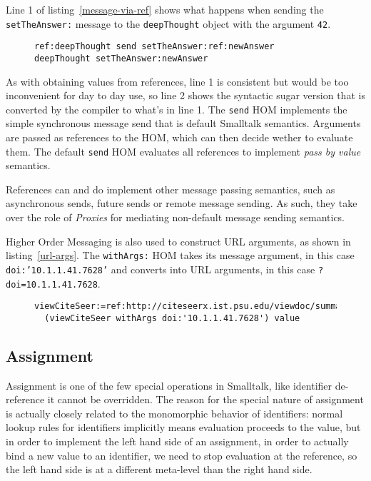 \documentclass[preprint,authoryear]{llncs}
\begin{document}
  Line 1 of listing~\ref{message-via-ref} shows
what happens when sending the {\tt setTheAnswer:} message to the {\tt deepThought} object with
the argument {\tt 42}.

\begin{figure}[htbp]
\begin{lstlisting}[style=numbers,label=message-via-ref,caption=Message sending via reference and with syntactic sugar]
ref:deepThought send setTheAnswer:ref:newAnswer
deepThought setTheAnswer:newAnswer
\end{lstlisting}
\end{figure}

As with obtaining values from references, line 1 is consistent but would be too inconvenient for day to day use,
so line 2 shows the syntactic sugar version that is converted by the compiler to what's in line 1.  The {\tt send}
HOM implements the simple synchronous message send that is default Smalltalk semantics.   Arguments
are passed as references to the HOM, which can then decide wether to evaluate them.  The default {\tt send}
HOM evaluates all references to implement \emph{pass by value} semantics.

References can and do implement other message passing semantics, such as asynchronous sends, future
sends or remote message sending.  As such, they take over the role of \emph{Proxies} for mediating non-default
message sending semantics.  


Higher Order Messaging is also used to construct URL arguments, as shown in listing~\ref{url-args}.  The {\tt withArgs:}
HOM takes its message argument, in this case {\tt doi:'10.1.1.41.7628'} and converts into URL arguments,
in this case {\tt ?doi=10.1.1.41.7628}.

\begin{figure}[htbp]
\begin{lstlisting}[style=L,label=url-args,caption=URL arguments via reference and higher order message.]
  viewCiteSeer:=ref:http://citeseerx.ist.psu.edu/viewdoc/summary.
  (viewCiteSeer withArgs doi:'10.1.1.41.7628') value
\end{lstlisting}
\end{figure}


\subsection{Assignment}

Assignment is one of the few special operations in Smalltalk, like identifier de-reference it cannot be overridden.
The reason for the special nature of assignment is actually closely related to the monomorphic behavior
of identifiers:  normal lookup rules for identifiers implicitly means evaluation proceeds to the value, but in order to implement the left
hand side of an assignment, in order to actually bind a new value to an identifier, we need to stop evaluation
at the reference, so the left hand side is at a different meta-level than the right hand side\cite{kay-assignment}.
\end{document}
